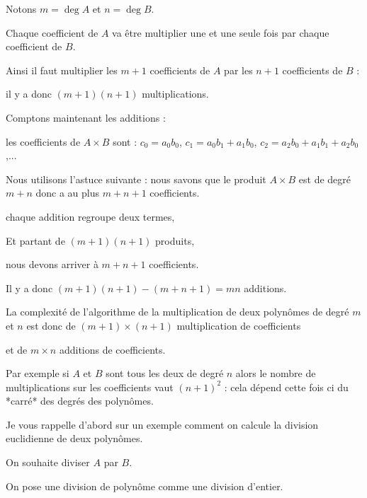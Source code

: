 \change

 Notons $m = \deg A$ et $n = \deg B$.
 
\change

Chaque coefficient de $A$ va être multiplier une et une seule fois par chaque coefficient de $B$.

 Ainsi il faut multiplier les $m+1$ coefficients de $A$ par les $n+1$ coefficients de $B$ :
 
\change

 il y a donc $(m+1)(n+1)$ multiplications.
 
\change

  
  Comptons maintenant les additions : 
  
 
\change

  les coefficients de $A\times B$ sont : 
  $c_0 = a_0 b_0$, $c_1 = a_0b_1+a_1b_0$, $c_2=a_2b_0+a_1b_1+a_2b_0$,...
   
   
\change


  Nous utilisons l'astuce suivante : nous savons que le produit $A\times B$ est de degré $m+n$
  donc a au plus $m+n+1$ coefficients.
  
\change

  chaque addition regroupe deux termes, 
  
\change
  
Et partant de $(m+1)(n+1)$ produits, 
  
nous devons arriver à $m+n+1$ coefficients.

 \change 
 
  Il y a donc $(m+1)(n+1)-(m+n+1) = mn$ additions.
  
La complexité de l'algorithme de la multiplication de deux polynômes de degré $m$ et $n$
est donc de $(m+1) \times (n+1)$ multiplication de coefficients

et de $m \times n$ additions de coefficients.

\change

Par exemple si $A$ et $B$ sont tous les deux de degré $n$ alors le nombre de multiplications sur les coefficients
vaut $(n+1)^2$ : cela dépend cette fois ci du *carré* des degrés des polynômes.

\diapo

Je vous rappelle d'abord sur un exemple comment on calcule la division euclidienne de deux polynômes.

On souhaite diviser $A$ par $B$.

\change

On pose une division de polynôme comme une division d'entier.

